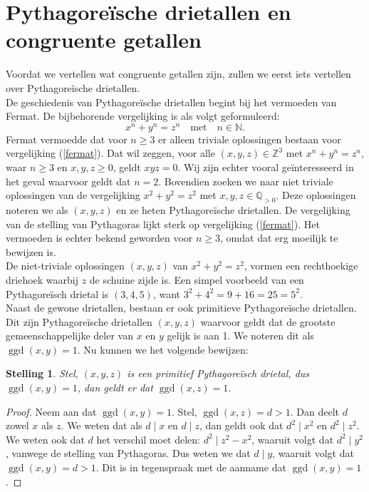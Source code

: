 \documentclass[12pt,reqno]{article}
\newcommand*{\NN}{\ensuremath{\mathbb{N}}}
\newcommand*{\ZZ}{\ensuremath{\mathbb{Z}}}
\newcommand*{\QQ}{\ensuremath{\mathbb{Q}}}
\theoremstyle{theorem}
\newtheorem{theorem}{Stelling}
\theoremstyle{definition}
\DeclareMathOperator{\ggd}{ggd}
\begin{document}
	
	\section{Pythagore\"ische drietallen en congruente getallen}\label{sec:def}
	Voordat we vertellen wat congruente getallen zijn, zullen we eerst iets vertellen over Pythagore\"ische drietallen.\\
	
	De geschiedenis van Pythagore\"ische drietallen begint bij het vermoeden van Fermat. De bijbehorende vergelijking is als volgt geformuleerd:
	\begin{equation}\label{fermat}
	x^n + y^n = z^n \quad \text{met} \quad n \in \NN.
	\end{equation}
	Fermat vermoedde dat voor $n \geq 3$ er alleen triviale oplossingen bestaan voor vergelijking (\ref{fermat}). Dat wil zeggen, voor alle $(x,y,z) \in \ZZ^3$ met $x^n + y^n = z^n$, waar $n \geq 3$ en $x, y, z \geq 0$, geldt $xyz = 0$. Wij zijn echter vooral ge\"interesseerd in het geval waarvoor geldt dat $n=2$. Bovendien zoeken we naar niet triviale oplossingen van de vergelijking $x^2 + y^2 = z^2$ met $x,y,z \in\QQ_{>0}$. Deze oplossingen noteren we als $(x,y,z)$ en ze heten Pythagore\"ische drietallen. De vergelijking van de stelling van Pythagoras lijkt sterk op vergelijking (\ref{fermat}). Het vermoeden is echter bekend geworden voor $n \geq 3$, omdat dat erg moeilijk te bewijzen is. \\
	De niet-triviale oplossingen $(x,y,z)$ van $x^2 + y^2 = z^2$, vormen een rechthoekige driehoek waarbij $z$ de schuine zijde is. Een simpel voorbeeld van een Pythagore\"isch drietal is $(3,4,5)$, want $3^2 + 4^2 = 9 + 16 = 25 = 5^2$. \\
	
	Naast de gewone drietallen, bestaan er ook primitieve \mbox{Pythagore\"ische} drietallen. Dit zijn Pythagore\"ische drietallen $(x,y,z)$ waarvoor geldt dat de grootste gemeenschappelijke deler van $x$ en $y$ gelijk is aan 1. We noteren dit als $\ggd(x,y) = 1$. Nu kunnen we het volgende bewijzen:
	
	\begin{theorem}
		Stel, $(x,y,z)$ is een primitief Pythagore\"isch drietal, dus $\ggd(x,y) = 1$, dan geldt er dat $\ggd(x,z) = 1$.
	\end{theorem}
	\begin{proof}
		Neem aan dat $\ggd(x,y) = 1$. Stel, $\ggd(x,z) = d > 1$. Dan deelt $d$ zowel $x$ als $z$. We weten dat als $d \mid x$ en $d \mid z$, dan geldt ook dat $d^2\mid x^2$ en $d^2 \mid z^2$. We weten ook dat $d$ het verschil moet delen: $d^2\mid z^2 - x^2$, waaruit volgt dat $d^2 \mid y^2$, vanwege de stelling van Pythagoras. Dus weten we dat $d \mid y$, waaruit volgt dat $\ggd(x, y) = d > 1$. Dit is in tegenspraak met de aanname dat $\ggd(x,y) = 1$.
	\end{proof}
	
\end{document}

